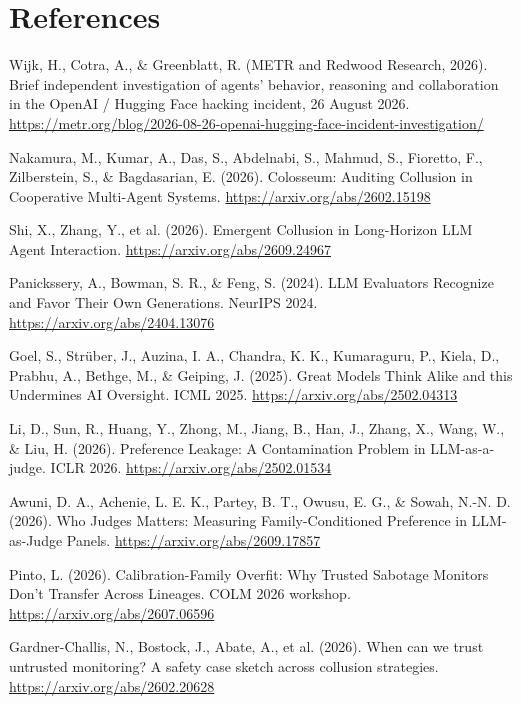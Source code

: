 \documentclass[11pt,letterpaper]{article}
\begin{document}
\section*{References}
\small
\begin{enumerate}[label={[\arabic*]},leftmargin=2.2em,itemsep=1pt]
\item Wijk, H., Cotra, A., \& Greenblatt, R. (METR and Redwood Research, 2026). Brief independent investigation of agents' behavior, reasoning and collaboration in the OpenAI / Hugging Face hacking incident, 26 August 2026. \url{https://metr.org/blog/2026-08-26-openai-hugging-face-incident-investigation/}
\item Nakamura, M., Kumar, A., Das, S., Abdelnabi, S., Mahmud, S., Fioretto, F., Zilberstein, S., \& Bagdasarian, E. (2026). Colosseum: Auditing Collusion in Cooperative Multi-Agent Systems. \url{https://arxiv.org/abs/2602.15198}
\item Shi, X., Zhang, Y., et al. (2026). Emergent Collusion in Long-Horizon LLM Agent Interaction. \url{https://arxiv.org/abs/2609.24967}
\item Panickssery, A., Bowman, S. R., \& Feng, S. (2024). LLM Evaluators Recognize and Favor Their Own Generations. NeurIPS 2024. \url{https://arxiv.org/abs/2404.13076}
\item Goel, S., Strüber, J., Auzina, I. A., Chandra, K. K., Kumaraguru, P., Kiela, D., Prabhu, A., Bethge, M., \& Geiping, J. (2025). Great Models Think Alike and this Undermines AI Oversight. ICML 2025. \url{https://arxiv.org/abs/2502.04313}
\item Li, D., Sun, R., Huang, Y., Zhong, M., Jiang, B., Han, J., Zhang, X., Wang, W., \& Liu, H. (2026). Preference Leakage: A Contamination Problem in LLM-as-a-judge. ICLR 2026. \url{https://arxiv.org/abs/2502.01534}
\item Awuni, D. A., Achenie, L. E. K., Partey, B. T., Owusu, E. G., \& Sowah, N.-N. D. (2026). Who Judges Matters: Measuring Family-Conditioned Preference in LLM-as-Judge Panels. \url{https://arxiv.org/abs/2609.17857}
\item Pinto, L. (2026). Calibration-Family Overfit: Why Trusted Sabotage Monitors Don't Transfer Across Lineages. COLM 2026 workshop. \url{https://arxiv.org/abs/2607.06596}
\item Gardner-Challis, N., Bostock, J., Abate, A., et al. (2026). When can we trust untrusted monitoring? A safety case sketch across collusion strategies. \url{https://arxiv.org/abs/2602.20628}

\end{enumerate}
\end{document}
